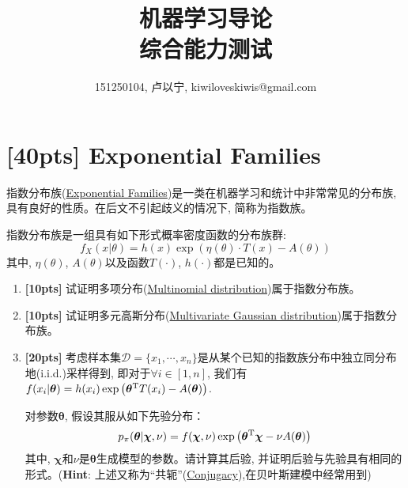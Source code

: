 \documentclass[a4paper,UTF8]{article}
\numberwithin{equation}{section}
\theoremstyle{definition}
\begin{document}
\title{机器学习导论\\
综合能力测试}
\author{151250104, 卢以宁,  kiwiloveskiwis@gmail.com}
\maketitle
\section{[40pts] Exponential Families}
\label{Exponential Families}
指数分布族(\href{https://en.wikipedia.org/wiki/Exponential_family}{Exponential Families})是一类在机器学习和统计中非常常见的分布族, 具有良好的性质。在后文不引起歧义的情况下, 简称为指数族。

指数分布族是一组具有如下形式概率密度函数的分布族群:
\begin{equation}
f_X(x|\theta) = h(x) \exp \left(\eta(\theta) \cdot T(x) -A(\theta)\right)
\end{equation}  
其中, $\eta(\theta)$, $A(\theta)$以及函数$T(\cdot)$, $h(\cdot)$都是已知的。
\begin{enumerate}[(1)]
\item \textbf{[10pts]} 试证明多项分布(\href{https://en.wikipedia.org/wiki/Multinomial_distribution}{Multinomial distribution})属于指数分布族。

\item \textbf{[10pts]} 试证明多元高斯分布(\href{https://en.wikipedia.org/wiki/Multivariate_normal_distribution}{Multivariate Gaussian distribution})属于指数分布族。

\item \textbf{[20pts]} 考虑样本集$\mathcal{D}=\{ x_1,\cdots, x_n\}$是从某个已知的指数族分布中独立同分布地(i.i.d.)采样得到, 即对于$\forall i\in [1,n]$, 我们有$f( x_i|\boldsymbol\theta) = h(x_i) \exp \left ( {\boldsymbol\theta}^{\rm T}T(x_i) -A(\boldsymbol\theta)\right)$. 

对参数$\boldsymbol\theta$, 假设其服从如下先验分布：
\begin{equation}
p_\pi(\boldsymbol\theta|\boldsymbol\chi,\nu) = f(\boldsymbol\chi,\nu) \exp \left (\boldsymbol\theta^{\rm T} \boldsymbol\chi - \nu A(\boldsymbol\theta) \right )
\end{equation}
其中, $\boldsymbol\chi$和$\nu$是$\boldsymbol\theta$生成模型的参数。请计算其后验, 并证明后验与先验具有相同的形式。(\textbf{Hint}: 上述又称为“共轭”(\href{https://people.eecs.berkeley.edu/~jordan/courses/260-spring10/other-readings/chapter9.pdf}{Conjugacy}),在贝叶斯建模中经常用到)
\end{enumerate}
\end{document}
